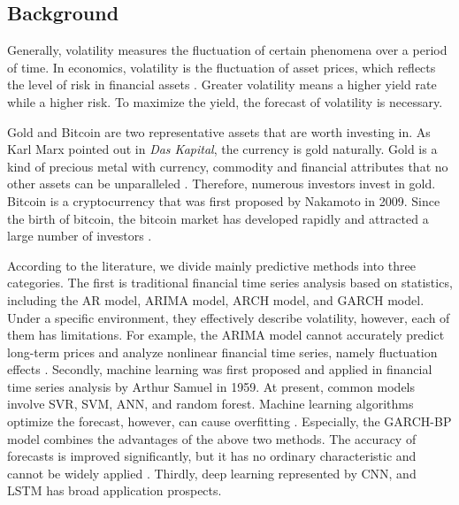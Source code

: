 \documentclass[12pt]{article}
\begin{document}
\subsection{Background}
Generally, volatility measures the fluctuation of certain phenomena over a period of time. In economics, volatility is the fluctuation of asset prices, which reflects the level of risk in financial assets \cite{1}. Greater volatility means a higher yield rate while a higher risk. To maximize the yield, the forecast of volatility is necessary.  

Gold and Bitcoin are two representative assets that are worth investing in. As Karl Marx pointed out in \emph{Das Kapital}, the currency is gold naturally. Gold is a kind of precious metal with currency, commodity and financial attributes that no other assets can be unparalleled \cite{2}. Therefore, numerous investors invest in gold. Bitcoin is a cryptocurrency that was first proposed by Nakamoto in 2009.  Since the birth of bitcoin, the bitcoin market has developed rapidly and attracted a large number of investors \cite{3}.

According to the literature, we divide mainly predictive methods into three categories. The first is traditional financial time series analysis based on statistics, including the AR model, ARIMA model, ARCH model, and GARCH model. Under a specific environment, they effectively describe volatility, however, each of them has limitations. For example, the ARIMA model cannot accurately predict long-term prices and analyze nonlinear financial time series, namely fluctuation effects \cite{4}. Secondly, machine learning was first proposed and applied in financial time series analysis by Arthur Samuel in 1959. At present, common models involve SVR, SVM, ANN, and random forest. Machine learning algorithms optimize the forecast, however, can cause overfitting \cite{5}. Especially, the GARCH-BP model combines the advantages of the above two methods. The accuracy of forecasts is improved significantly, but it has no ordinary characteristic and cannot be widely applied \cite{6}. Thirdly, deep learning represented by CNN, and LSTM has broad application prospects.
\end{document}
